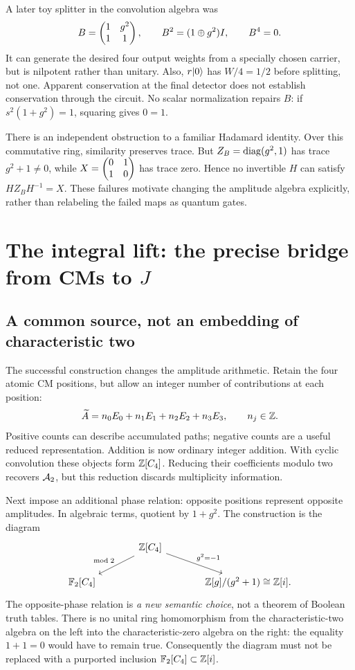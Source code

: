 A later toy splitter in the convolution algebra was
\begin{equation}
 B=\begin{pmatrix}1&g^2\\1&1\end{pmatrix},\qquad B^2=(1\oplus g^2)I,
 \qquad B^4=0.
\end{equation}
It can generate the desired four output weights from a specially chosen carrier, but is nilpotent rather than unitary. Also, $r\lvert 0\rangle$ has $W/4=1/2$ before splitting, not one. Apparent conservation at the final detector does not establish conservation through the circuit. No scalar normalization repairs $B$: if $s^2(1+g^2)=1$, squaring gives $0=1$.

There is an independent obstruction to a familiar Hadamard identity. Over this commutative ring, similarity preserves trace. But $Z_B=\operatorname{diag}(g^2,1)$ has trace $g^2+1\ne0$, while $X=\begin{pmatrix}0&1\\1&0\end{pmatrix}$ has trace zero. Hence no invertible $H$ can satisfy $HZ_BH^{-1}=X$. These failures motivate changing the amplitude algebra explicitly, rather than relabeling the failed maps as quantum gates.

\section{The integral lift: the precise bridge from CMs to \texorpdfstring{$J$}{J}}\label{sec:lift}
\subsection{A common source, not an embedding of characteristic two}
The successful construction changes the amplitude arithmetic. Retain the four atomic CM positions, but allow an integer number of contributions at each position:
\begin{equation}
 \widetilde A=n_0E_0+n_1E_1+n_2E_2+n_3E_3,
 \qquad n_j\in\mathbb Z.
\end{equation}
Positive counts can describe accumulated paths; negative counts are a useful reduced representation. Addition is now ordinary integer addition. With cyclic convolution these objects form $\mathbb Z[C_4]$. Reducing their coefficients modulo two recovers $\mathcal A_2$, but this reduction discards multiplicity information.

Next impose an additional phase relation: opposite positions represent opposite amplitudes. In algebraic terms, quotient by $1+g^2$. The construction is the diagram
\begin{equation}\label{eq:commonlift}
 \begin{tikzcd}[column sep=large]
 & \Z[C_4] \arrow[dl,"\bmod 2"'] \arrow[dr,"g^2=-1"] & \\
 \F_2[C_4] && \Z[g]/(g^2+1)\cong\Z[i].
 \end{tikzcd}
\end{equation}
The opposite-phase relation is \emph{a new semantic choice}, not a theorem of Boolean truth tables. There is no unital ring homomorphism from the characteristic-two algebra on the left into the characteristic-zero algebra on the right: the equality $1+1=0$ would have to remain true. Consequently the diagram must not be replaced with a purported inclusion $\mathbb F_2[C_4]\subset\mathbb Z[i]$.


